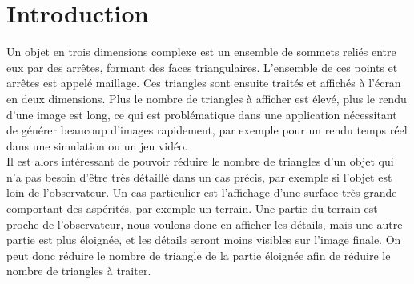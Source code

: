 \documentclass[12pt]{report}
\begin{document}



\tableofcontents

\thispagestyle{empty} %


\newpage

\chapter*{Introduction}
\setcounter{chapter}{1}

Un objet en trois dimensions complexe est un ensemble de sommets reliés
entre eux par des arrêtes, formant des faces triangulaires. L'ensemble
de ces points et arrêtes est appelé maillage. Ces triangles sont ensuite
traités et affichés à l'écran en deux dimensions. Plus le nombre de
triangles à afficher est élevé, plus le rendu d'une image est long, ce
qui est problématique dans une application nécessitant de générer
beaucoup d'images rapidement, par exemple pour un rendu temps réel dans
une simulation ou un jeu vidéo.\\
Il est alors intéressant de pouvoir réduire le nombre de triangles d'un
objet qui n'a pas besoin d'être très détaillé dans un cas précis, par
exemple si l'objet est loin de l'observateur. Un cas particulier est
l'affichage d'une surface très grande comportant des aspérités, par
exemple un terrain. Une partie du terrain est proche de l'observateur,
nous voulons donc en afficher les détails, mais une autre partie est
plus éloignée, et les détails seront moins visibles sur l'image finale.
On peut donc réduire le nombre de triangle de la partie éloignée afin de
réduire le nombre de triangles à traiter.
\end{document}
